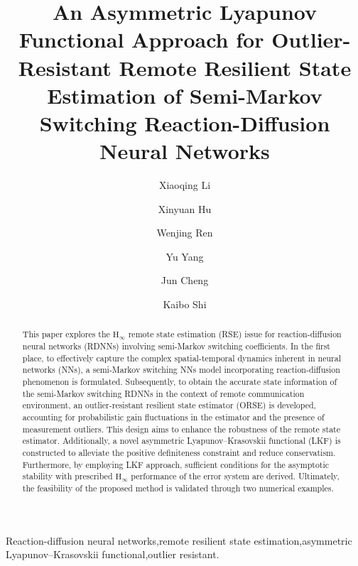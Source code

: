 \documentclass[preprint,review,fleqn,sort&compress,3p]{elsarticle}
\theoremstyle{definition}%
\begin{document}
\begin{frontmatter}

\title{{An Asymmetric Lyapunov Functional Approach for Outlier-Resistant Remote Resilient State Estimation of Semi-Markov Switching Reaction-Diffusion Neural Networks}}

\author[a]{Xiaoqing Li}
{}
\author[a]{Xinyuan Hu}
\author[a]{Wenjing Ren}
\author[a]{Yu Yang}
\author[b]{Jun Cheng}
\author[c]{Kaibo Shi}

\address[a]{School of Electrical Engineering and Automation, Hefei University of Technology, Hefei 230009, China}
\address[b]{College of Mathematics and Statistics, Guangxi Normal University, Guilin 541006, China}
\address[c]{School of Electronic Information and Electrical Engineering, Chengdu University, Chengdu 610106, China}

\begin{abstract}
	This paper explores the $\text{H}_\infty$ remote state estimation (RSE) issue for reaction-diffusion neural networks (RDNNs) involving semi-Markov switching coefficients. In the first place, to effectively capture the complex spatial-temporal dynamics inherent in neural networks (NNs), a semi-Markov switching NNs model incorporating reaction-diffusion phenomenon is formulated. Subsequently, to obtain the accurate state information of the semi-Markov switching RDNNs in the context of remote communication environment, an outlier-resistant resilient state estimator (ORSE) is developed, accounting for probabilistic gain fluctuations in the estimator and the presence of measurement outliers. This design aims to enhance the robustness of the remote state estimator. Additionally, a novel asymmetric Lyapunov–Krasovskii functional (LKF) is constructed to alleviate the positive definiteness constraint and reduce conservatism. Furthermore, by employing LKF approach, sufficient conditions for the asymptotic stability with prescribed $\text{H}_\infty$ performance of the error system  are derived. Ultimately, the feasibility of the proposed method is validated through two numerical examples.
\end{abstract}

\begin{keyword}
	Reaction-diffusion neural networks\sep remote resilient state estimation\sep asymmetric Lyapunov–Krasovskii functional\sep outlier resistant.
\end{keyword}

\end{frontmatter}
\end{document}
